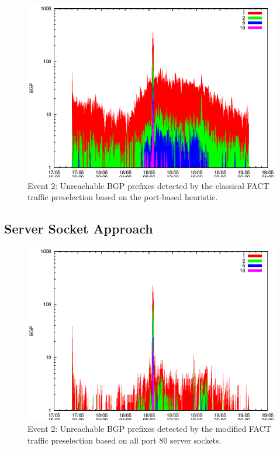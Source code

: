 \begin{figure}
	[p] \centering 
	\includegraphics[width=0.75\linewidth]{images/events/2010_05_18/bgp_log_port80_ref.eps}
	\caption{Event 2: Unreachable BGP prefixes detected by the classical FACT traffic preselection based on the port-based heuristic.} 
	\label{fig:TIER1_FACT_REF} 
\end{figure}

\subsection{Server Socket Approach}

\begin{figure}
	[p] \centering 
	\includegraphics[width=0.75\linewidth]{images/events/2010_05_18/bgp_log_allPort80SES.eps}
	\caption{Event 2: Unreachable BGP prefixes detected by the modified FACT traffic preselection based on all port 80 server sockets.} 
	\label{fig:TIER1_FACT_allSES80} 
\end{figure}


